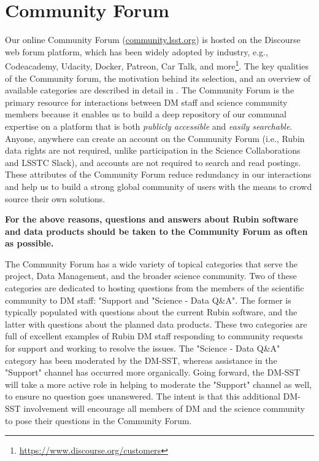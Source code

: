 \documentclass[DM,lsstdraft,authoryear,toc]{lsstdoc}
\begin{document}
\section{Community Forum}\label{sec:forum}

Our online Community Forum (\url{community.lsst.org}) is hosted on the Discourse web forum platform, which has been widely adopted by industry, e.g., Codeacademy, Udacity, Docker, Patreon, Car Talk, and more\footnote{\url{https://www.discourse.org/customers}}.
The key qualities of the Community forum, the motivation behind its selection, and an overview of available categories are described in detail in .
The Community Forum is the primary resource for interactions between DM staff and science community members because it enables us to build a deep repository of our communal expertise on a platform that is both {\it publicly accessible} and {\it easily searchable}.
Anyone, anywhere can create an account on the Community Forum (i.e., Rubin data rights are not required, unlike participation in the Science Collaborations and \gls{LSSTC} Slack), and accounts are not required to search and read postings. 
These attributes of the Community Forum reduce redundancy in our interactions and help us to build a strong global community of users with the means to crowd source their own solutions.

{\bf For the above reasons, questions and answers about Rubin software and data products should be taken to the Community Forum as often as possible.}

The Community Forum has a wide variety of topical categories that serve the project, Data Management, and the broader science community. 
Two of these categories are dedicated to hosting questions from the members of the scientific community to DM staff: "Support and "Science - Data Q\&A".
The former is typically populated with questions about the current Rubin software, and the latter with questions about the planned data products.
These two categories are full of excellent examples of Rubin DM staff responding to community requests for support and working to resolve the issues.
The "Science - Data Q\&A" category has been moderated by the DM-SST, whereas assistance in the "Support" channel has occurred more organically.
Going forward, the DM-SST will take a more active role in helping to moderate the "Support" channel as well, to ensure no question goes unanswered.
The intent is that this additional DM-SST involvement will encourage all members of DM and the science community to pose their questions in the Community Forum.
\end{document}
